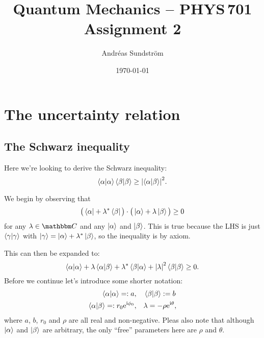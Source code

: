 \documentclass[11pt,letter, swedish, english
]{article}
\begin{document}
\title{Quantum Mechanics -- PHYS\,701 \\
Assignment 2}
\author{Andréas Sundström}
\date{\today}

\maketitle



\section{The uncertainty relation}

\subsection{The Schwarz inequality}
Here we're looking to derive the Schwarz inequality:
\begin{equation}\label{eq:schwarz}
\braket{\alpha}\braket{\beta} \ge \abs{\braket{\alpha}{\beta}}^2.
\end{equation}


We begin by observing that
\begin{equation}\label{eq:ineq1}
\big( \bra{\alpha} + \lambda^*\bra{\beta} \big) \cdot
\big( \ket{\alpha} + \lambda\ket{\beta} \big) \ge 0
\end{equation}
for any $\lambda\in\C$ and any $\ket{\alpha}$ and $\ket{\beta}$. This
is true because the LHS is just $\braket{\gamma}$ with
$\ket{\gamma}=\ket{\alpha}+\lambda^*\ket{\beta}$, so the inequality
is by axiom. 

This can then be expanded to:
\begin{equation}\label{eq:ineq2}
\braket{\alpha} + \lambda \braket{\alpha}{\beta} +
\lambda^*\braket{\beta}{\alpha} + \abs{\lambda}^2\braket{\beta} \ge 0.
\end{equation}
Before we continue let's introduce some shorter notation:
\begin{equation}\label{eq:short_notation}
\begin{aligned}
\braket{\alpha}=:a \qcomma& \braket\beta := b \\
\braket{\alpha}{\beta}=:r_0\ee^{\ii\phi_0}\qcomma & \lambda = -\rho\ee^{\ii\theta},
\end{aligned}
\end{equation}
where $a$, $b$, $r_0$ and $\rho$ are all real and non-negative.
Pleas also note that although $\ket\alpha$ and $\ket\beta$ are
arbitrary, the only ``free'' parameters here are $\rho$ and $\theta$.
\end{document}
